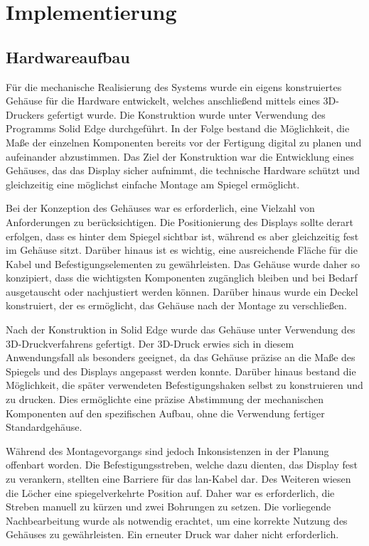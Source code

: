 \chapter{Implementierung}
\label{chap:impl}
\section{Hardwareaufbau}

Für die mechanische Realisierung des Systems wurde ein eigens konstruiertes Gehäuse für die Hardware entwickelt, welches anschließend mittels eines 3D-Druckers gefertigt wurde. Die Konstruktion wurde unter Verwendung des Programms Solid Edge durchgeführt. In der Folge bestand die Möglichkeit, die Maße der einzelnen Komponenten bereits vor der Fertigung digital zu planen und aufeinander abzustimmen. Das Ziel der Konstruktion war die Entwicklung eines Gehäuses, das das Display sicher aufnimmt, die technische Hardware schützt und gleichzeitig eine möglichst einfache Montage am Spiegel ermöglicht.

Bei der Konzeption des Gehäuses war es erforderlich, eine Vielzahl von Anforderungen zu berücksichtigen. Die Positionierung des Displays sollte derart erfolgen, dass es hinter dem Spiegel sichtbar ist, während es aber gleichzeitig fest im Gehäuse sitzt. Darüber hinaus ist es wichtig, eine ausreichende Fläche für die Kabel und Befestigungselementen zu gewährleisten. Das Gehäuse wurde daher so konzipiert, dass die wichtigsten Komponenten zugänglich bleiben und bei Bedarf ausgetauscht oder nachjustiert werden können. Darüber hinaus wurde ein Deckel konstruiert, der es ermöglicht, das Gehäuse nach der Montage zu verschließen.

Nach der Konstruktion in Solid Edge wurde das Gehäuse unter Verwendung des 3D-Druckverfahrens gefertigt. Der 3D-Druck erwies sich in diesem Anwendungsfall als besonders geeignet, da das Gehäuse präzise an die Maße des Spiegels und des Displays angepasst werden konnte. Darüber hinaus bestand die Möglichkeit, die später verwendeten Befestigungshaken selbst zu konstruieren und zu drucken. Dies ermöglichte eine präzise Abstimmung der mechanischen Komponenten auf den spezifischen Aufbau, ohne die Verwendung fertiger Standardgehäuse.

Während des Montagevorgangs sind jedoch Inkonsistenzen in der Planung offenbart worden. Die Befestigungsstreben, welche dazu dienten, das Display fest zu verankern, stellten eine Barriere für das \ac{lan}-Kabel dar. Des Weiteren wiesen die Löcher eine spiegelverkehrte Position auf. Daher war es erforderlich, die Streben manuell zu kürzen und zwei Bohrungen zu setzen. Die vorliegende Nachbearbeitung wurde als notwendig erachtet, um eine korrekte Nutzung des Gehäuses zu gewährleisten. Ein erneuter Druck war daher nicht erforderlich.

